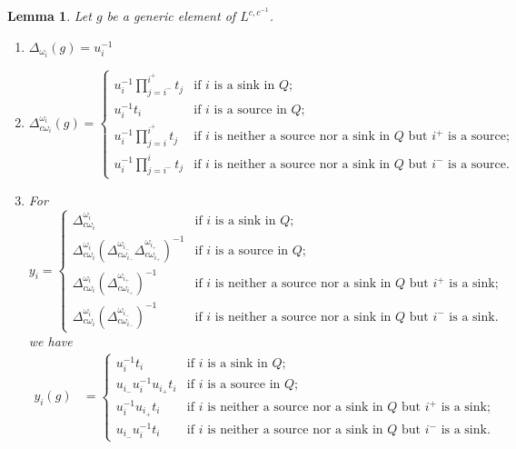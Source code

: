 \documentclass[12pt]{amsart}
\newtheorem{lemma}[theorem]{Lemma}
\numberwithin{equation}{section}
\begin{document}
  \begin{lemma}\mbox{}
    Let $g$ be a generic element of $L^{c,c^{-1}}$.
    \begin{enumerate}
      \item $\Delta_{\omega_i}(g)=u_i^{-1}$
      \item $\Delta_{c\omega_i}^{\omega_i}(g)=\begin{cases}u_i^{-1}\prod\limits_{j=i^-}^{i^+}t_j & \text{if $i$ is a sink in $Q$;}\\u_i^{-1}t_i & \text{if $i$ is a source in $Q$;}\\u_i^{-1}\prod\limits_{j=i}^{i^+}t_j & \text{if $i$ is neither a source nor a sink in $Q$ but $i^+$ is a source;}\\u_i^{-1}\prod\limits_{j=i^-}^it_j & \text{if $i$ is neither a source nor a sink in $Q$ but $i^-$ is a source.}\end{cases}$
      \item For 
      \begin{equation}
        y_i=\begin{cases}\Delta_{c\omega_i}^{\omega_i} & \text{if $i$ is a sink in $Q$;}\\\Delta_{c\omega_i}^{\omega_i}\left(\Delta_{c\omega_{i_-}}^{\omega_{i_-}}\Delta_{c\omega_{i_+}}^{\omega_{i_+}}\right)^{-1} & \text{if $i$ is a source in $Q$;}\\\Delta_{c\omega_i}^{\omega_i}\left(\Delta_{c\omega_{i_+}}^{\omega_{i_+}}\right)^{-1} & \text{if $i$ is neither a source nor a sink in $Q$ but $i^+$ is a sink;}\\\Delta_{c\omega_i}^{\omega_i}\left(\Delta_{c\omega_{i_-}}^{\omega_{i_-}}\right)^{-1} & \text{if $i$ is neither a source nor a sink in $Q$ but $i^-$ is a sink.}\end{cases}
      \end{equation}
      we have
      \begin{align}
        y_i(g)&=\begin{cases}u_i^{-1}t_i & \text{if $i$ is a sink in $Q$;}\\u_{i_-}u_i^{-1}u_{i_+}t_i & \text{if $i$ is a source in $Q$;}\\u_i^{-1}u_{i_+}t_i & \text{if $i$ is neither a source nor a sink in $Q$ but $i^+$ is a sink;}\\u_{i_-}u_i^{-1}t_i & \text{if $i$ is neither a source nor a sink in $Q$ but $i^-$ is a sink.}\end{cases}
      \end{align}
    \end{enumerate}
  \end{lemma}
\end{document}
